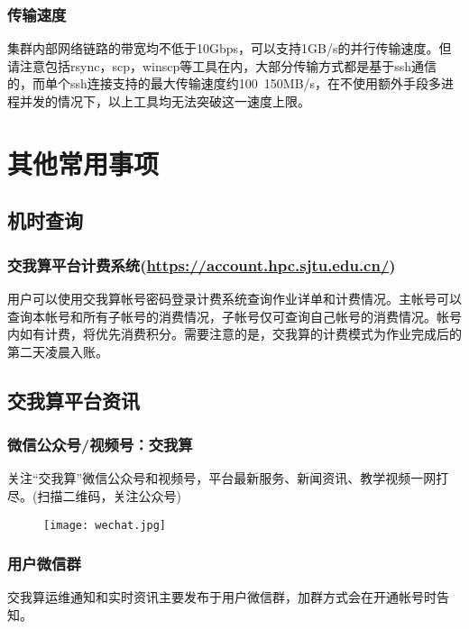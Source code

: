 \documentclass[cn, 12pt, hang, black, chinese]{elegantbook}
\begin{document}
\subsection*{传输速度}

集群内部网络链路的带宽均不低于10Gbps，可以支持1GB/s的并行传输速度。但请注意包括rsync，scp，winscp等工具在内，大部分传输方式都是基于ssh通信的，而单个ssh连接支持的最大传输速度约100~150MB/s，在不使用额外手段多进程并发的情况下，以上工具均无法突破这一速度上限。

\chapter{其他常用事项}

\section{机时查询}
\subsection*{交我算平台计费系统(\href{https://account.hpc.sjtu.edu.cn/}{https://account.hpc.sjtu.edu.cn/})}
用户可以使用交我算帐号密码登录计费系统查询作业详单和计费情况。主帐号可以查询本帐号和所有子帐号的消费情况，子帐号仅可查询自己帐号的消费情况。帐号内如有计费，将优先消费积分。需要注意的是，交我算的计费模式为作业完成后的第二天凌晨入账。

\section{交我算平台资讯}
\subsection*{微信公众号/视频号：交我算}
关注“交我算”微信公众号和视频号，平台最新服务、新闻资讯、教学视频一网打尽。(扫描二维码，关注公众号)

\begin{figure}[!htb]
\centering
\texttt{[image: wechat.jpg]}
\end{figure}

\subsection*{用户微信群}
交我算运维通知和实时资讯主要发布于用户微信群，加群方式会在开通帐号时告知。
\end{document}
